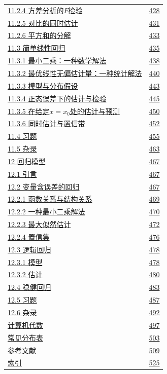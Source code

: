 \begin{longtable}{@{}p{}r@{}}
\hyperref[sec:11.2.4]{11.2.4 方差分析的$F$检验} & \hyperref[sec:11.2.4]{428} \\
\hyperref[sec:11.2.5]{11.2.5 对比的同时估计} & \hyperref[sec:11.2.5]{431} \\
\hyperref[sec:11.2.6]{11.2.6 平方和的分解} & \hyperref[sec:11.2.6]{433} \\
\hyperref[sec:11.3]{11.3 简单线性回归} & \hyperref[sec:11.3]{435} \\
\hyperref[sec:11.3.1]{11.3.1 最小二乘：一种数学解法} & \hyperref[sec:11.3.1]{438} \\
\hyperref[sec:11.3.2]{11.3.2 最优线性无偏估计量：一种统计解法} & \hyperref[sec:11.3.2]{440} \\
\hyperref[sec:11.3.3]{11.3.3 模型与分布假设} & \hyperref[sec:11.3.3]{443} \\
\hyperref[sec:11.3.4]{11.3.4 正态误差下的估计与检验} & \hyperref[sec:11.3.4]{445} \\
\hyperref[sec:11.3.5]{11.3.5 在给定$x=x_0$处的估计与预测} & \hyperref[sec:11.3.5]{450} \\
\hyperref[sec:11.3.6]{11.3.6 同时估计与置信带} & \hyperref[sec:11.3.6]{452} \\
\hyperref[sec:11.4]{11.4 习题} & \hyperref[sec:11.4]{455} \\
\hyperref[sec:11.5]{11.5 杂录} & \hyperref[sec:11.5]{463} \\
\hyperref[sec:12]{12 回归模型} & \hyperref[sec:12]{467} \\
\hyperref[sec:12.1]{12.1 引言} & \hyperref[sec:12.1]{467} \\
\hyperref[sec:12.2]{12.2 变量含误差的回归} & \hyperref[sec:12.2]{467} \\
\hyperref[sec:12.2.1]{12.2.1 函数关系与结构关系} & \hyperref[sec:12.2.1]{469} \\
\hyperref[sec:12.2.2]{12.2.2 一种最小二乘解法} & \hyperref[sec:12.2.2]{470} \\
\hyperref[sec:12.2.3]{12.2.3 最大似然估计} & \hyperref[sec:12.2.3]{472} \\
\hyperref[sec:12.2.4]{12.2.4 置信集} & \hyperref[sec:12.2.4]{476} \\
\hyperref[sec:12.3]{12.3 逻辑回归} & \hyperref[sec:12.3]{478} \\
\hyperref[sec:12.3.1]{12.3.1 模型} & \hyperref[sec:12.3.1]{478} \\
\hyperref[sec:12.3.2]{12.3.2 估计} & \hyperref[sec:12.3.2]{480} \\
\hyperref[sec:12.4]{12.4 稳健回归} & \hyperref[sec:12.4]{483} \\
\hyperref[sec:12.5]{12.5 习题} & \hyperref[sec:12.5]{487} \\
\hyperref[sec:12.6]{12.6 杂录} & \hyperref[sec:12.6]{492} \\
\hyperref[app:computer-algebra]{计算机代数} & \hyperref[app:computer-algebra]{497} \\
\hyperref[app:distributions]{常见分布表} & \hyperref[app:distributions]{503} \\
\hyperref[app:references]{参考文献} & \hyperref[app:references]{509} \\
\hyperref[app:index]{索引} & \hyperref[app:index]{525} \\
\end{longtable}\endgroup
